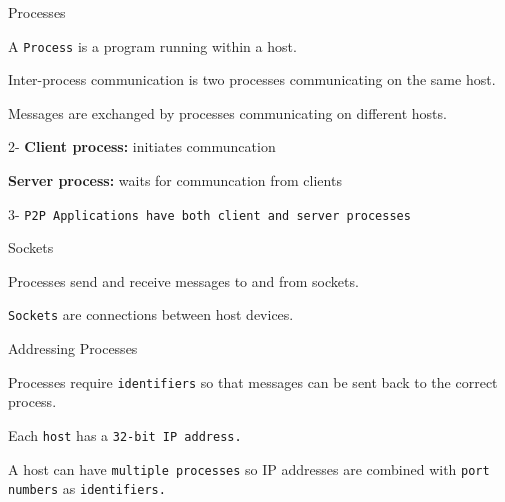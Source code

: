 \begin{topic}{Processes}

A \texttt{Process} is a program running within a host.

Inter-process communication is two processes communicating on the same host.

Messages are exchanged by processes communicating on different hosts.

\begin{subtopic}{2-}
\textbf{Client process:} initiates communcation

\textbf{Server process:} waits for communcation from clients
\end{subtopic}

\begin{subtopic}{3-}
\texttt{P2P Applications have both client and server processes}
\end{subtopic}

\end{topic}

\begin{topic}{Sockets}

Processes send and receive messages to and from sockets.

\texttt{Sockets} are connections between host devices.

\end{topic}

\begin{topic}{Addressing Processes}

Processes require \texttt{identifiers} so that messages can be sent back to the correct process.

Each \texttt{host} has a \texttt{32-bit IP address.}

A host can have \texttt{multiple processes} so IP addresses are combined with \texttt{port numbers} as \texttt{identifiers.}

\end{topic}